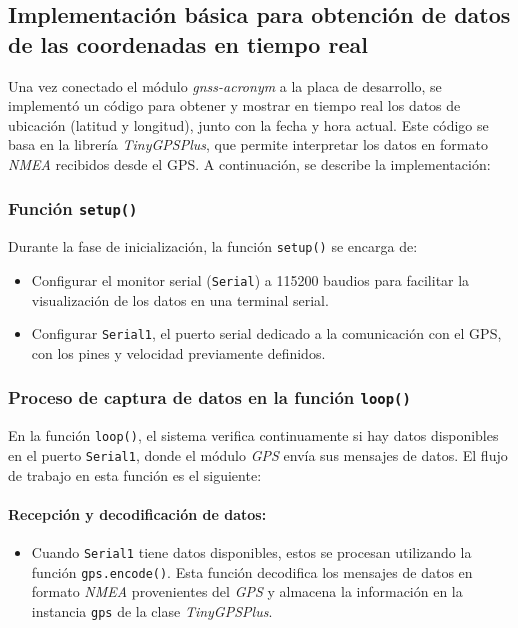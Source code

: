 \subsection{Implementación básica para obtención de datos de las coordenadas en tiempo real}

Una vez conectado el módulo \textit{\acrshort{gnss-acronym}} a la placa de desarrollo, se implementó un código para obtener y mostrar en tiempo real los datos de ubicación (latitud y longitud), junto con la fecha y hora actual. Este código se basa en la librería \textit{TinyGPSPlus}, que permite interpretar los datos en formato \textit{NMEA} recibidos desde el GPS. A continuación, se describe la implementación:

\subsubsection{Función \texttt{setup()}}
Durante la fase de inicialización, la función \texttt{setup()} se encarga de:
\begin{itemize}
    \item Configurar el monitor serial (\texttt{Serial}) a 115200 baudios para facilitar la visualización de los datos en una terminal serial.
    \item Configurar \texttt{Serial1}, el puerto serial dedicado a la comunicación con el GPS, con los pines y velocidad previamente definidos.
\end{itemize}

\subsubsection{Proceso de captura de datos en la función \texttt{loop()}}

En la función \texttt{loop()}, el sistema verifica continuamente si hay datos disponibles en el puerto \texttt{Serial1}, donde el módulo \textit{GPS} envía sus mensajes de datos. El flujo de trabajo en esta función es el siguiente:

\paragraph{Recepción y decodificación de datos:}
\begin{itemize}
    \item Cuando \texttt{Serial1} tiene datos disponibles, estos se procesan utilizando la función \texttt{gps.encode()}. Esta función decodifica los mensajes de datos en formato \textit{NMEA} provenientes del \textit{GPS} y almacena la información en la instancia \texttt{gps} de la clase \textit{TinyGPSPlus}.
\end{itemize}

